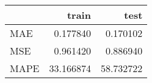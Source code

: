 \begin{tabular}{lrr}
\toprule
{} &      train &       test \\
\midrule
MAE  &   0.177840 &   0.170102 \\
MSE  &   0.961420 &   0.886940 \\
MAPE &  33.166874 &  58.732722 \\
\bottomrule
\end{tabular}

